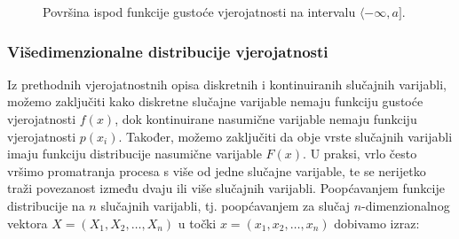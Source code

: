 \documentclass[a4paper,12pt,oneside]{memoir}
\begin{document}
                \begin{figure}[H]
                    \centering
                    \caption{Površina ispod funkcije gustoće vjerojatnosti na intervalu $\langle-\infty,a]$.}
                    \label{fig:44}
                \end{figure}

                \subsubsection{Višedimenzionalne distribucije vjerojatnosti}

                Iz prethodnih vjerojatnostnih opisa diskretnih i kontinuiranih slučajnih varijabli, možemo zaključiti kako diskretne slučajne varijable nemaju funkciju gustoće vjerojatnosti $f(x)$, dok kontinuirane nasumične varijable nemaju funkciju vjerojatnosti $p(x_i)$. Također, možemo zaključiti da obje vrste slučajnih varijabli imaju funkciju distribucije nasumične varijable $F(x)$. U praksi, vrlo često vršimo promatranja procesa s više od jedne slučajne varijable, te se nerijetko traži povezanost između dvaju ili više slučajnih varijabli. Poopćavanjem funkcije distribucije na $n$ slučajnih varijabli, tj. poopćavanjem za slučaj $n$-dimenzionalnog vektora $X=(X_1,X_2,\ldots,X_n)$ u točki $x=(x_1,x_2,\ldots,x_n)$ dobivamo izraz:
\end{document}
